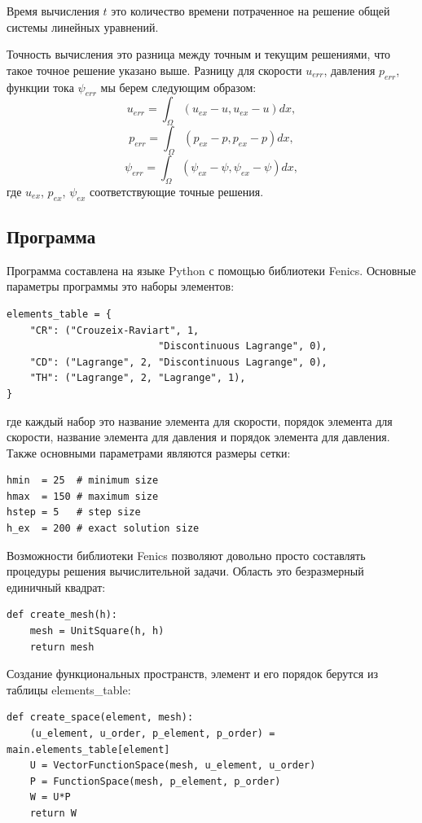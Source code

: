 \documentclass[12pt]{article}
\begin{document}
Время вычисления $t$ это количество времени потраченное на решение общей системы линейных уравнений.

Точность вычисления это разница между точным и текущим решениями, что такое точное решение указано выше. Разницу для скорости $u_{err}$, давления $p_{err}$, функции тока $\psi_{err}$ мы берем следующим образом:
\begin{equation}
u_{err} = \int_{\Omega} (u_{ex} - u, u_{ex} - u) dx,
\end{equation}
\begin{equation}
p_{err} = \int_{\Omega} (p_{ex} - p, p_{ex} - p) dx,
\end{equation}
\begin{equation}
\psi_{err} = \int_{\Omega} (\psi_{ex} - \psi, \psi_{ex} - \psi) dx,
\end{equation}
где $u_{ex}$, $p_{ex}$, $\psi_{ex}$ соответствующие точные решения.

\subsection{Программа}
Программа составлена на языке Python с помощью библиотеки Fenics.
Основные параметры программы это наборы элементов:
\begin{lstlisting}
elements_table = {
    "CR": ("Crouzeix-Raviart", 1, 
                          "Discontinuous Lagrange", 0),
    "CD": ("Lagrange", 2, "Discontinuous Lagrange", 0),    
    "TH": ("Lagrange", 2, "Lagrange", 1),
}
\end{lstlisting}
где каждый набор это название элемента для скорости, порядок элемента для скорости, название элемента для давления и порядок элемента для давления. Также основными параметрами являются размеры сетки:
\begin{lstlisting}
hmin  = 25  # minimum size
hmax  = 150 # maximum size
hstep = 5   # step size
h_ex  = 200 # exact solution size
\end{lstlisting}

Возможности библиотеки Fenics позволяют довольно просто составлять процедуры решения вычислительной задачи. Область это безразмерный единичный квадрат:
\begin{lstlisting}
def create_mesh(h):
    mesh = UnitSquare(h, h)
    return mesh
\end{lstlisting}

Создание функциональных пространств, элемент и его порядок берутся из таблицы elements\_table:
\begin{lstlisting}
def create_space(element, mesh):
    (u_element, u_order, p_element, p_order) = main.elements_table[element]
    U = VectorFunctionSpace(mesh, u_element, u_order)
    P = FunctionSpace(mesh, p_element, p_order)
    W = U*P
    return W
\end{lstlisting}
\end{document}
